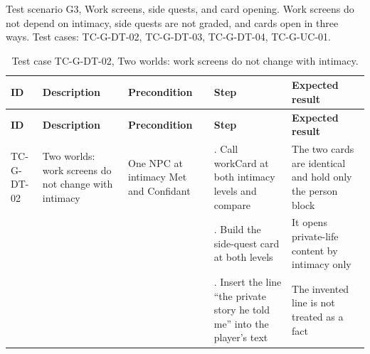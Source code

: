 Test scenario G3, Work screens, side quests, and card opening. Work screens do not depend on intimacy, side quests are not graded, and cards open in three ways. Test cases: TC-G-DT-02, TC-G-DT-03, TC-G-DT-04, TC-G-UC-01.

{\small
\begin{longtable}{|>{\raggedright\arraybackslash}p{}|>{\raggedright\arraybackslash}p{}|>{\raggedright\arraybackslash}p{}|>{\raggedright\arraybackslash}p{}|>{\raggedright\arraybackslash}p{}|}
\caption{Test case TC-G-DT-02, Two worlds: work screens do not change with intimacy.} \\
\hline
\textbf{ID} & \textbf{Description} & \textbf{Precondition} & \textbf{Step} & \textbf{Expected result} \\ \hline
\endfirsthead
\hline
\textbf{ID} & \textbf{Description} & \textbf{Precondition} & \textbf{Step} & \textbf{Expected result} \\ \hline
\endhead
TC-G-DT-02 & Two worlds: work screens do not change with intimacy & One NPC at intimacy Met and Confidant & 1. Call workCard at both intimacy levels and compare & The two cards are identical and hold only the person block \\ \hline
 &  &  & 2. Build the side-quest card at both levels & It opens private-life content by intimacy only \\ \hline
 &  &  & 3. Insert the line ``the private story he told me'' into the player's text & The invented line is not treated as a fact \\ \hline
\end{longtable}
}

